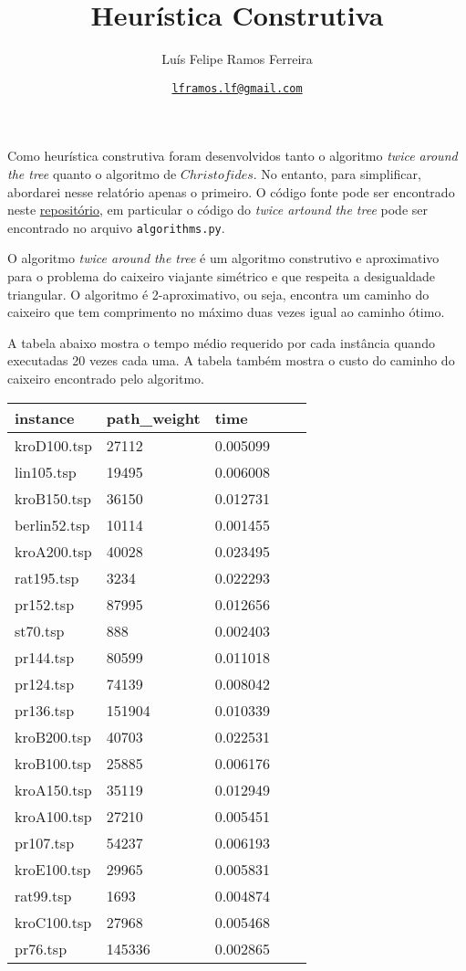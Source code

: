 \documentclass{article}
\title{Heurística Construtiva}
\author{Luís Felipe Ramos Ferreira}
\date{\href{mailto:lframos.lf@gmail.com}{\texttt{lframos.lf@gmail.com}}
}
\begin{document}
\maketitle

Como heurística construtiva foram desenvolvidos tanto o algoritmo \textit{twice around the tree} quanto o algoritmo de \(Christofides\).
No entanto, para simplificar, abordarei nesse relatório apenas o primeiro. O código fonte pode ser encontrado neste \href{https://github.com/lframosferreira/tsp-heuristics}{repositório}, em particular
o código do \textit{twice artound the tree} pode ser encontrado no arquivo \texttt{algorithms.py}.

O algoritmo \textit{twice around the tree} é um algoritmo construtivo e aproximativo para o problema do caixeiro viajante simétrico e que respeita a desigualdade triangular. O algoritmo é 2-aproximativo, ou seja,
encontra um caminho do caixeiro que tem comprimento no máximo duas vezes igual ao caminho ótimo.

A tabela abaixo mostra o tempo médio requerido por cada instância quando executadas 20 vezes cada uma. A tabela também mostra o custo do caminho do caixeiro encontrado pelo algoritmo.

\begin{center}
	\begin{tabular}{lllrr}
		\toprule
		instance     & path\_weight & time     \\
		\midrule
		kroD100.tsp  & 27112        & 0.005099 \\
		lin105.tsp   & 19495        & 0.006008 \\
		kroB150.tsp  & 36150        & 0.012731 \\
		berlin52.tsp & 10114        & 0.001455 \\
		kroA200.tsp  & 40028        & 0.023495 \\
		rat195.tsp   & 3234         & 0.022293 \\
		pr152.tsp    & 87995        & 0.012656 \\
		st70.tsp     & 888          & 0.002403 \\
		pr144.tsp    & 80599        & 0.011018 \\
		pr124.tsp    & 74139        & 0.008042 \\
		pr136.tsp    & 151904       & 0.010339 \\
		kroB200.tsp  & 40703        & 0.022531 \\
		kroB100.tsp  & 25885        & 0.006176 \\
		kroA150.tsp  & 35119        & 0.012949 \\
		kroA100.tsp  & 27210        & 0.005451 \\
		pr107.tsp    & 54237        & 0.006193 \\
		kroE100.tsp  & 29965        & 0.005831 \\
		rat99.tsp    & 1693         & 0.004874 \\
		kroC100.tsp  & 27968        & 0.005468 \\
		pr76.tsp     & 145336       & 0.002865 \\
		\bottomrule
	\end{tabular}
\end{center}
\end{document}
